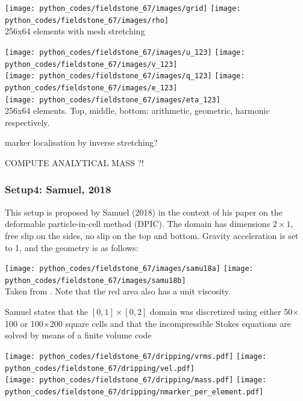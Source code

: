 \begin{center}
\texttt{[image: python\_codes/fieldstone\_67/images/grid]}
\texttt{[image: python\_codes/fieldstone\_67/images/rho]}\\
{\captionfont 256x64 elements with mesh stretching}
\end{center}


\begin{center}
\texttt{[image: python\_codes/fieldstone\_67/images/u\_123]}
\texttt{[image: python\_codes/fieldstone\_67/images/v\_123]}\\
\texttt{[image: python\_codes/fieldstone\_67/images/q\_123]}
\texttt{[image: python\_codes/fieldstone\_67/images/e\_123]}\\
\texttt{[image: python\_codes/fieldstone\_67/images/eta\_123]}\\
{\captionfont 256x64 elements. Top, middle, bottom: arithmetic, geometric, harmonic respectively.}
\end{center}


marker localisation by inverse stretching?

COMPUTE ANALYTICAL MASS ?!

\newpage
\subsubsection*{Setup4: Samuel, 2018}

This setup is proposed by Samuel (2018) \cite{samu18} in the context of his paper 
on the deformable particle-in-cell method (DPIC).
The domain has dimensions $2 \times 1$, free slip on the sides, no slip on the top and bottom. 
Gravity acceleration is set to 1, and the geometry is as follows:

\begin{center}
\texttt{[image: python\_codes/fieldstone\_67/images/samu18a]}
\texttt{[image: python\_codes/fieldstone\_67/images/samu18b]}\\
{\captionfont Taken from \cite{samu18}. Note that the red area also has a unit viscosity.}
\end{center}

Samuel states that the $[0,1] \times [0,2]$ domain was discretized using either 50$\times$100 
or 100$\times$200 square cells and that the incompressible Stokes equations are solved by means 
of a finite volume code \cite{saev10,samu12}


\begin{center}
\texttt{[image: python\_codes/fieldstone\_67/dripping/vrms.pdf]}
\texttt{[image: python\_codes/fieldstone\_67/dripping/vel.pdf]}\\
\texttt{[image: python\_codes/fieldstone\_67/dripping/mass.pdf]}
\texttt{[image: python\_codes/fieldstone\_67/dripping/nmarker\_per\_element.pdf]}
\end{center}


